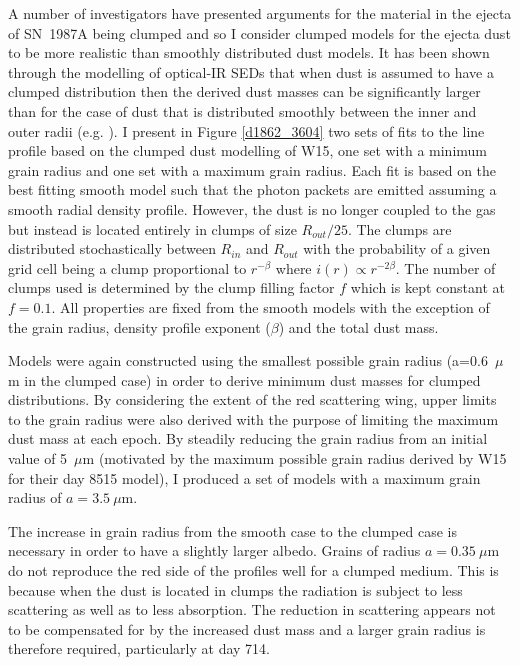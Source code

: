 A number of investigators have presented arguments for the material in the 
ejecta of SN~1987A being clumped \citep{Lucy1991,Li1992,Kozma1998b} and so 
I consider clumped models for the ejecta dust to be more realistic than 
smoothly distributed dust models. It has been shown through the modelling 
of optical-IR SEDs that when dust is assumed to have a clumped 
distribution then the derived dust masses can be significantly larger than 
for the case of dust that is distributed smoothly between the inner and 
outer radii (e.g. \citet{Ercolano2007,Owen2015}). I present in Figure \ref{d1862_3604} two sets of 
fits to the line profile based on the clumped dust modelling of W15, one 
set with a minimum grain radius and one set with a maximum grain radius.  
Each fit is based on the best fitting smooth model such that the photon 
packets are emitted assuming a smooth radial density profile.  However, 
the dust is no longer coupled to the gas but instead is located entirely 
in clumps of size $R_{out}/25$.  The clumps are distributed stochastically 
between $R_{in}$ and $R_{out}$ with the probability of a given grid cell 
being a clump proportional to $r^{- \beta }$ where $i(r) \propto r^{-2 
\beta}$.  The number of clumps used is determined by the clump filling 
factor $f$ which is kept constant at $f=0.1$.  All properties are fixed 
from the smooth models with the exception of the grain radius, density 
profile exponent ($\beta$) and the total dust mass.

Models were again constructed using the smallest possible grain radius (a=0.6~$\mu$m in the clumped case) in order to derive minimum dust masses 
for clumped distributions.  By considering the extent of the red 
scattering wing, upper limits to the grain radius were also derived with the 
purpose of limiting the maximum dust mass at each epoch.  By steadily 
reducing the grain radius from an initial value of 5~$\mu$m (motivated by 
the maximum possible grain radius derived by W15 for their day 8515 model), 
I produced a set of models with a maximum grain radius of $a=3.5~\mu$m.  



The increase in grain radius from the smooth case to the clumped case is 
necessary in order to have a slightly larger albedo.  Grains of radius 
$a=0.35~\mu$m do not reproduce the red side of the profiles well for a 
clumped medium.  This is because when the dust is located in clumps the 
radiation is subject to less scattering as well as to less absorption.  
The reduction in scattering appears not to be compensated for by the 
increased dust mass and a larger grain radius is therefore required, 
particularly at day 714.

